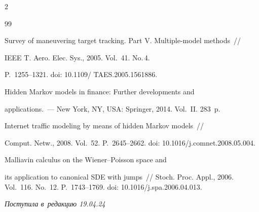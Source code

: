 \begin{multicols}{2}
{{\begin{thebibliography}{99}


Survey of maneuvering target tracking. Part V. Multiple-model methods~//


IEEE T. Aero.  Elec. Sys., 2005. Vol.~41. No.\,4. 


P.~1255--1321. doi: 10.1109/ TAES.2005.1561886.









Hidden Markov models in finance: Further developments and


applications.~--- New York, NY, USA: Springer, 2014.  Vol.~II. 283~p.









Internet traffic modeling by means of hidden Markov models~//


Comput. Netw., 2008. Vol.~52. P.~2645--2662. doi: 10.1016/j.comnet.2008.05.004.







  Malliavin calculus on the Wiener--Poisson space and 


its application to canonical SDE with jumps~// Stoch. Proc. Appl., 2006. Vol.~116. No.~12. P.~1743--1769. doi: 10.1016/j.spa.2006.04.013.





\end{thebibliography}





 }


 }





\end{multicols}





\vspace*{-6pt}





\hfill{\small\textit{Поступила в~редакцию 19.04.24}}





